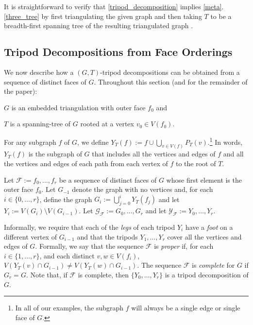 \documentclass[a4paper,UKenglish,autoref]{lipics-v2021}
\begin{document}
It is straightforward to verify that \cref{tripod_decomposition} implies \cref{meta}.\ref{three_tree} by first triangulating the given graph and then taking $T$ to be a breadth-first spanning tree of the resulting triangulated graph \cite[Observation~35]{dujmovic.joret.ea:planar}.


\subsection{Tripod Decompositions from Face Orderings}
\label{orderings}

We now describe how a $(G,T)$-tripod decompositions can be obtained from a sequence of distinct faces of $G$.  Throughout this section (and for the remainder of the paper):
\begin{compactitem}
   \item $G$ is an embedded triangulation with outer face $f_0$ and
   \item $T$ is a spanning-tree of $G$ rooted at a vertex $v_0\in V(f_0)$.
\end{compactitem}
For any subgraph $f$ of $G$, we define $Y_T(f):=f\cup \bigcup_{v\in V(f)} P_T(v)$.\footnote{In all of our examples, the subgraph $f$ will always be a single edge or single face of $G$.}  In words, $Y_T(f)$ is the subgraph of $G$ that includes all the vertices and edges of $f$ and all the vertices and edges of each path from each vertex of $f$ to the root of $T$.

Let $\mathcal{F}:=f_0,\ldots,f_{r}$ be a sequence of distinct faces of $G$ whose first element is the outer face $f_0$. Let $G_{-1}$ denote the graph with no vertices and, for each $i\in\{0,\ldots,r\}$, define the graph $G_i:=\bigcup_{j=0}^i Y_T(f_j)$ and let $Y_i:=V(G_i)\setminus V(G_{i-1})$.  Let $\mathcal{G_F}:= G_0,\ldots,G_{r}$ and let $\mathcal{Y_F}:=Y_0,\ldots,Y_r$.  

Informally, we require that each of the \emph{legs} of each tripod $Y_i$ have  a \emph{foot} on a different vertex of $G_{i-1}$ and that the tripods $Y_1,\ldots,Y_r$ cover all the vertices and edges of $G$. Formally, we say that the sequence $\mathcal{F}$ is \emph{proper} if, for each $i\in\{1,\ldots,r\}$, and each distinct $v,w\in V(f_i)$, $V(Y_T(v)\cap G_{i-1})\neq V(Y_T(w)\cap G_{i-1})$.  The sequence $\mathcal{F}$ is \emph{complete} for $G$ if $G_r=G$.  Note that, if $\mathcal{F}$ is complete, then $\{Y_0,\ldots,Y_r\}$ is a tripod decomposition of $G$.
\end{document}
